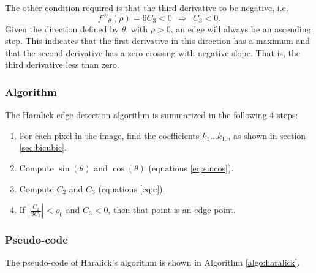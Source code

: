 \documentclass{ipol}
\numberwithin{equation}{section}
\numberwithin{table}{section}
\begin{document}
The other condition required is that the third derivative to be negative, i.e.\
\begin{equation}
	f'''_{\theta}(\rho) = 6C_3 < 0 \ \ \Rightarrow \ \ C_3 < 0.
\end{equation}
Given the direction defined by $\theta$, with $\rho>0$, an edge will always be an ascending step. This 
indicates that the first derivative in this direction has a maximum and that the second derivative has a zero 
crossing with negative slope. That is, the third derivative less than zero.


\subsubsection{Algorithm}

The Haralick edge detection algorithm is summarized in the following 4 steps:

\begin{enumerate}
	\item For each pixel in the image, find the coefficients $k_1 \hdots k_{10}$, as shown in section \ref{sec:bicubic}.
	\item Compute $\sin(\theta)$ and $\cos(\theta)$ (equations \ref{eq:sincos}).
	\item Compute $C_2$ and $C_3$ (equations \ref{eq:c}).
	\item If $\left| \frac{C_2}{3C_3} \right| < \rho_0$ and $C_3 < 0$, then that point is an edge point.
\end{enumerate}


\subsubsection{Pseudo-code}

The pseudo-code of Haralick's algorithm is shown in Algorithm \ref{algo:haralick}.
\end{document}

